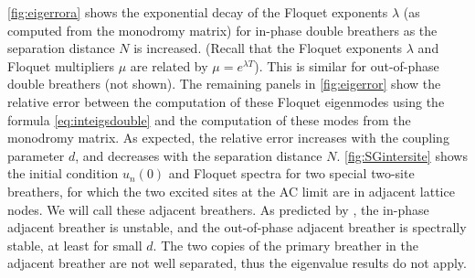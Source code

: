 \documentclass[12pt,reqno]{amsart}
\theoremstyle{definition}
\begin{document}
\cref{fig:eigerrora} shows the exponential decay of the Floquet exponents $\lambda$ (as computed from the monodromy matrix) for in-phase double breathers as the separation distance $N$ is increased. (Recall that the Floquet exponents $\lambda$ and Floquet multipliers $\mu$ are related by $\mu = e^{\lambda T}$).
This is similar for out-of-phase double breathers (not shown). The remaining panels in \cref{fig:eigerror} show the relative error between the computation of these Floquet eigenmodes using the formula \cref{eq:inteigsdouble} and the computation of these modes from the monodromy matrix. As expected, the relative error increases with the coupling parameter $d$, and decreases with the separation distance $N$. \cref{fig:SGintersite} shows the initial condition $u_n(0)$ and Floquet spectra for two special two-site breathers, for which the two excited sites at the AC limit are in adjacent lattice nodes. We will call these adjacent breathers.
As predicted by \cite{cuevas-maraver2016}, the in-phase adjacent breather is unstable, and the out-of-phase adjacent breather is spectrally stable, at least for small $d$. The two copies of the primary breather in the adjacent breather are not well separated, thus the eigenvalue results do not apply.
\end{document}
